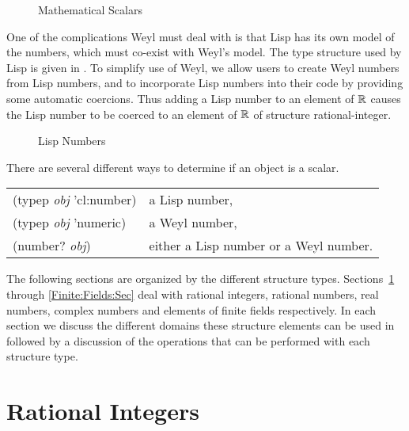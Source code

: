 \begin{figure}
\begin{center}
\end{center}
\caption{Mathematical Scalars\label{NumberElements:Fig}}
\end{figure}

One of the complications Weyl must deal with is that Lisp has its own
model of the numbers, which must co-exist with Weyl's model.  The type
structure used by Lisp is given in .  To
simplify use of Weyl, we allow users to create Weyl numbers from Lisp
numbers, and to incorporate Lisp numbers into their code by providing
some automatic coercions.  Thus adding a Lisp number to an element of
${\Bbb R}$ causes the Lisp number to be coerced to an element of ${\Bbb R}$ of
structure {\sf rational-integer}.

\begin{figure}
\begin{center}
\end{center}
\caption{Lisp Numbers\label{LispNumbers:Fig}}
\end{figure}

There are several different ways to determine if an object is a
scalar.  

\begin{center}
\begin{tabular}{ll}
{\sf (typep {\em obj} 'cl:number)}\index{number@{\sf cl:number}, a
Lisp type}& a Lisp number, \\ 
{\sf (typep {\em obj} 'numeric)} \index{numeric@{\sf numeric}, a
Lisp type}& a Weyl number, \\ 
{\sf (number? {\em obj})}\index{number?@{\sf number?}}& 
    either a Lisp number or a Weyl number.
\end{tabular}
\end{center}

The following sections are organized by the different structure types.
Sections~\ref{Rational:Integer:Sec} through \ref{Finite:Fields:Sec}
deal with rational integers, rational numbers, real numbers, complex
numbers and elements of finite fields respectively.  In each section
we discuss the different domains these structure elements can be used
in followed by a discussion of the operations that can be performed
with each structure type.

\section{Rational Integers}
\label{Rational:Integer:Sec}

